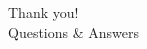 \begin{frame}[t,c]{}
  \begin{center}
  \Huge  Thank you! \\ Questions \& Answers
  \end{center}

\end{frame}